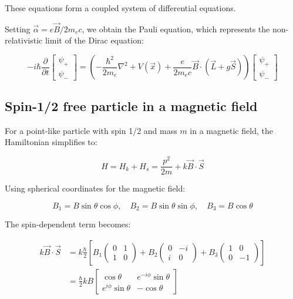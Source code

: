 \documentclass[italian]{HKNdocument}
\begin{document}
These equations form a coupled system of differential equations.

Setting $\vec{\alpha}=e \vec{B} / 2 m_{e} c$, we obtain the Pauli equation, which represents the non-relativistic limit of the Dirac equation:

\[
-i \hbar \frac{\partial}{\partial t}\left[\begin{array}{l}
\psi_{+}  \\
\psi_{-}
\end{array}\right]=\left(-\frac{\hbar^{2}}{2 m_{e}} \nabla^{2}+V(\vec{x})+\frac{e}{2 m_{e} c} \vec{B} \cdot(\vec{L}+g \vec{S})\right)\left[\begin{array}{l}
\psi_{+} \\
\psi_{-}
\end{array}\right]
\]

\subsection{Spin-1/2 free particle in a magnetic field}
For a point-like particle with spin 1/2 and mass $m$ in a magnetic field, the Hamiltonian simplifies to:

\begin{equation}
H=H_{k}+H_{s}=\frac{p^{2}}{2 m}+k \vec{B} \cdot \vec{S}
\end{equation}

Using spherical coordinates for the magnetic field:

\begin{equation}
B_{1}=B \sin \theta \cos \phi, \quad B_{2}=B \sin \theta \sin \phi, \quad B_{3}=B \cos \theta
\end{equation}

The spin-dependent term becomes:

\begin{align}
k \vec{B} \cdot \vec{S} &= k \frac{\hbar}{2}\left[B_{1}\left(\begin{array}{ll}
0 & 1 \\
1 & 0
\end{array}\right)+B_{2}\left(\begin{array}{cc}
0 & -i \\
i & 0
\end{array}\right)+B_{3}\left(\begin{array}{cc}
1 & 0 \\
0 & -1
\end{array}\right)\right] \\
&= \frac{\hbar}{2} k B\left[\begin{array}{cc}
\cos \theta & e^{-i \phi} \sin \theta \\
e^{i \phi} \sin \theta & -\cos \theta
\end{array}\right]
\end{align}
\end{document}
